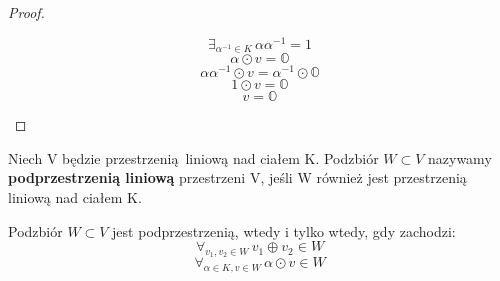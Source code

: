 \begin{theorem}
\begin{proof}
\begin{enumerate}
\begin{equation*}
                    \exists_{\alpha^{-1} \in K}\, \alpha\alpha^{-1} = 1
                \end{equation*}
                \begin{equation*}
                    \alpha\odot v = \mathds{O}
                \end{equation*}
                \begin{equation*}
                    \alpha\alpha^{-1}\odot v = \alpha^{-1}\odot\mathds{O}
                \end{equation*}
                \begin{equation*}
                    1\odot v = \mathds{O}
                \end{equation*}
                \begin{equation*}
                    v = \mathds{O}
                \end{equation*}
        \end{enumerate}
    \end{proof}
\end{theorem}
\begin{definition}
    Niech V będzie przestrzenią liniową nad ciałem K. Podzbiór $W \subset V$ nazywamy \textbf{podprzestrzenią liniową} przestrzeni V, jeśli W również jest przestrzenią liniową nad ciałem K.
\end{definition}
\begin{theorem}
    Podzbiór $W \subset V$ jest podprzestrzenią, wtedy i tylko wtedy, gdy zachodzi:
    \begin{equation*}
        \forall_{v_1,v_2 \in W} \, v_1 \oplus v_2 \in W
    \end{equation*}
    \begin{equation*}
        \forall_{\alpha \in K, v \in W} \, \alpha\odot v \in W
    \end{equation*}
\end{theorem}
